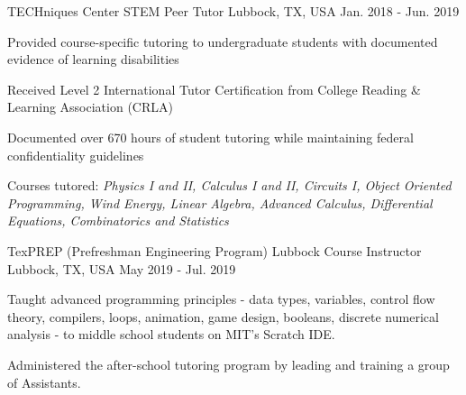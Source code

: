 \begin{cventries}
    \cventry
    {TECHniques Center}
    {STEM Peer Tutor}
    {Lubbock, TX, USA}
    {Jan. 2018 - Jun. 2019}
    {
        \begin{cvitems}
        \item{Provided course-specific tutoring to undergraduate students with documented evidence of learning disabilities}
        \item{Received Level 2 International Tutor Certification from College Reading \& Learning Association (CRLA)}
        \item{Documented over 670 hours of student tutoring while maintaining federal confidentiality guidelines}
        \item{Courses tutored: \textit{Physics I and II, Calculus I and II, Circuits I, Object Oriented Programming, Wind Energy, Linear Algebra, Advanced Calculus, Differential Equations, Combinatorics and Statistics}}
        \end{cvitems}
        \vspace{1em}
    }

    \cventry
    {TexPREP (Prefreshman Engineering Program) Lubbock}
    {Course Instructor}
    {Lubbock, TX, USA}
    {May 2019 - Jul. 2019}
    {
        \begin{cvitems}
        \item{Taught advanced programming principles - data types, variables, control flow theory, compilers, loops, animation, game design, booleans, discrete numerical analysis - to middle school students on MIT’s Scratch IDE.}
        \item{Administered the after-school tutoring program by leading and training a group of Assistants.}
        \end{cvitems}
        \vspace{1em}
    }

\end{cventries}
